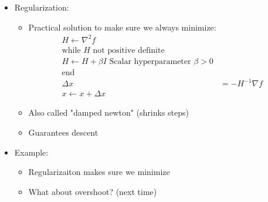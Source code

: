 \documentclass[11pt]{article}
\begin{document}
\begin{itemize}
    \item Regularization:
    \begin{itemize}
        \item Practical solution to make sure we always minimize:
        \begin{align*}
            H \leftarrow \nabla^2 f
            \\
            \text{while } H \text{ not positive definite} 
            \\
            H \leftarrow H + \beta I \text{ Scalar hyperparameter } \beta>0
            \\
            \text{end}
            \\
            \Delta x &= -H^{-1}\nabla f
            \\
            x \leftarrow x + \Delta x
        \end{align*}
        \item Also called "damped newton" (shrinks steps)
        \item Guarantees descent
    \end{itemize}
    \item Example:
    \begin{itemize}
        \item Regularizaiton makes sure we minimize
        \item What about overshoot? (next time)
    \end{itemize}
\end{itemize}
\end{document}
